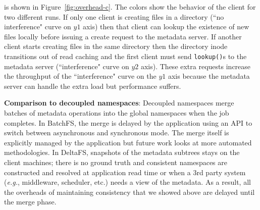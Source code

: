  is shown in
Figure~\ref{fig:overhead-c}. The colors show the behavior of the client for two
different runs.  If only one client is creating files in a directory
(``no interference" curve on \(y1\) axis) then that client can lookup the existence of
new files locally before issuing a create request to the metadata server. If
another client starts creating files in the same directory then the directory
inode transitions out of read caching and the first client must send
\texttt{lookup()}s to the metadata server (``interference" curve on \(y2\) axis).
These extra requests increase the throughput of the ``interference" curve on the
\(y1\) axis because the metadata server can handle the extra load but
performance suffers.  




\textbf{Comparison to decoupled namespaces}: Decoupled namespaces
merge batches of metadata operations into the global namespaces when the job
completes.  In BatchFS, the merge is delayed by the application using an API to
switch between asynchronous and synchronous mode. The merge itself is explicitly
managed by the application but future work looks at more automated
methodologies. In DeltaFS, snapshots of the metadata subtrees stays on the client
machines; there is no ground truth and consistent namespaces are constructed
and resolved at application read time or when a 3rd party system ({\it e.g.},
middleware, scheduler, etc.) needs a view of the metadata. As a result, all the
overheads of maintaining consistency that we showed above are delayed until the
merge phase.
